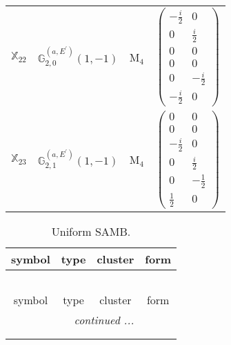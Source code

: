 \documentclass[fleqn,10pt,landscape]{article}
\begin{document}
\begin{itemize}
\begin{center}
\begin{longtable}{c|c|c|c}
$ \mathbb{X}_{22} $ & $\mathbb{G}_{2,0}^{(a,E^{\prime})}(1,-1)$ & M$_{4}$ & $\begin{pmatrix} - \frac{i}{2} & 0 \\ 0 & \frac{i}{2} \\ 0 & 0 \\ 0 & 0 \\ 0 & - \frac{i}{2} \\ - \frac{i}{2} & 0 \end{pmatrix}$ \\
$ \mathbb{X}_{23} $ & $\mathbb{G}_{2,1}^{(a,E^{\prime})}(1,-1)$ & M$_{4}$ & $\begin{pmatrix} 0 & 0 \\ 0 & 0 \\ - \frac{i}{2} & 0 \\ 0 & \frac{i}{2} \\ 0 & - \frac{1}{2} \\ \frac{1}{2} & 0 \end{pmatrix}$ \\
\end{longtable}
\end{center}
\begin{center}
\renewcommand{\arraystretch}{1.3}
\begin{longtable}{c|c|c|c}
\caption{Uniform SAMB.}
 \\
 \hline \hline
symbol & type & cluster & form \\ \hline \endfirsthead

\multicolumn{3}{l}{\tablename\ \thetable{}} \\
 \hline \hline
symbol & type & cluster & form \\ \hline \endhead

 \hline \hline
\multicolumn{3}{r}{\footnotesize\it continued ...} \\ \endfoot

 \hline \hline
\multicolumn{3}{r}{} \\ \endlastfoot


\end{longtable}
\end{center}
\end{itemize}
\end{document}
